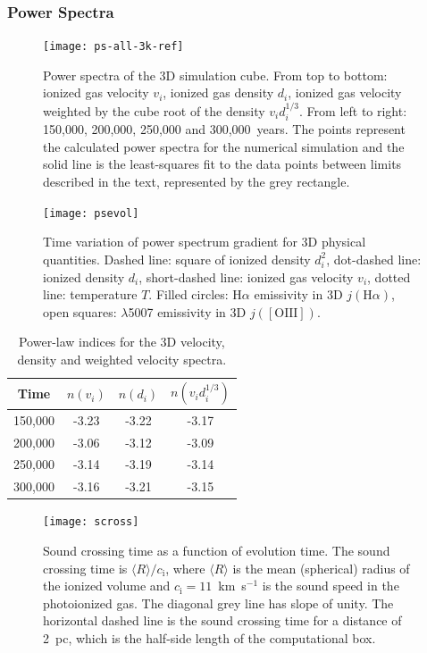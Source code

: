 \documentclass[useAMS,usenatbib]{mn2e}
\begin{document}
\subsubsection{Power Spectra}
\label{sssec:pspec}
\begin{figure}
\centering
\texttt{[image: ps-all-3k-ref]}
\caption{Power spectra of the 3D simulation cube. From top to bottom: ionized gas velocity
  $v_i$, ionized gas density $d_i$, ionized gas velocity weighted by the cube root
  of the density $v_i d_i^{1/3}$.  From left to right: 150,000, 200,000, 250,000 and
  300,000~years. The points represent the calculated power spectra for
  the numerical simulation  and the solid line is the least-squares fit to
the data points between limits described in the
text, represented by the grey rectangle.}
\label{fig:ps}
\end{figure}
\begin{figure}
\centering
\texttt{[image: psevol]}
\caption{Time variation of power spectrum gradient for 3D physical
  quantities. Dashed line: square of ionized density $d_i^2$,
  dot-dashed line: ionized density $d_i$, short-dashed line: ionized
  gas velocity $v_i$, dotted line: temperature $T$. Filled circles:
  H$\alpha$ emissivity in 3D $j(\mathrm{H}\alpha)$, open squares:
  \oiii$\lambda$5007 emissivity in 3D $j(\mathrm{[OIII]})$.}
\label{fig:psevol}
\end{figure}
\begin{table}
\caption{Power-law indices for the 3D velocity, density and weighted
  velocity spectra.}
\label{tab:ps}
\begin{tabular}{cccc}
\hline
Time&$n(v_i)$ & $n(d_i)$ & $n(v_i d_i^{1/3})$\\
\hline
150,000 &  -3.23 & -3.22 &  -3.17 \\
200,000 &  -3.06 & -3.12 &  -3.09 \\
250,000 & -3.14 & -3.19 &  -3.14 \\
300,000 & -3.16 & -3.21 &  -3.15\\
\hline
\end{tabular}
\end{table}
\begin{figure}
\centering
\texttt{[image: scross]}
\caption{Sound crossing time as a function of evolution time. The
  sound crossing time is $\langle R \rangle / c_\mathrm{i}$, where
  $\langle R \rangle$ is the mean (spherical) radius of the ionized
  volume and $c_\mathrm{i} = 11$~km~s$^{-1}$ is the sound speed in the
  photoionized gas. The diagonal grey line has slope of unity. The
  horizontal dashed line is the sound crossing time for a distance of
  2~pc, which is the half-side length of the computational box.}
\label{fig:scross}
\end{figure}
\end{document}
